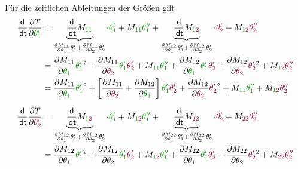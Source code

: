 \documentclass[a4paper, 12pt]{scrartcl}
\newcommand{\gruen}[2][gruen]{\textcolor{#1}{#2}}
\newcommand{\dunkelrot}[2][dunkelrot]{\textcolor{#1}{#2}}
\newcommand{\dt}{\thinspace \mathsf{dt}}
\begin{document}
Für die zeitlichen Ableitungen der Größen gilt 
\begin{align*}
    \frac{\mathsf{d}}{\dt} \frac{\partial T}{\partial \gruen{\theta_{1}'}} 
    &=
    \underbrace{
        \frac{\mathsf{d}}{\dt} M_{\gruen{1 1}}
    }_{
        \frac{\partial M_{11}}{\partial \theta_{1}} \theta_{1}' 
        + \frac{\partial M_{11}}{\partial \theta_{2}} \theta_{2}'
        } 
    \cdot \gruen{\theta_{1}'} + M_{\gruen{1 1}} \gruen{\theta_{1}''} + 
    \underbrace{
        \frac{\mathsf{d}}{\dt} M_{\gruen{1}\dunkelrot{2}}
        }_{
            \frac{\partial M_{12}}{\partial \theta_{1}} \theta_{1}' + \frac{\partial M_{12}}{\partial \theta_{2}} \theta_{2}'
            } 
        \cdot \dunkelrot{\theta_{2}'} + M_{\gruen{1}\dunkelrot{2}} \dunkelrot{\theta_{2}''} 
    \\
    &= \frac{\partial M_{11}}{\partial \gruen{\theta_{1}}} \gruen{\theta_{1}'}^2
    + \frac{\partial M_{11}}{\partial \dunkelrot{\theta_{2}}} \gruen{\theta_{1}'} \dunkelrot{ \theta_{2}'} 
    +  M_{\gruen{1 1}} \gruen{\theta_{1}''} 
    + \frac{\partial M_{12}}{\partial \gruen{\theta_{1}}} \gruen{\theta_{1}'} \dunkelrot{\theta_{2}'} 
    + \frac{\partial M_{12}}{\partial \dunkelrot{\theta_{2}}} \dunkelrot{\theta_{2}'}^2 
    + M_{\gruen{1}\dunkelrot{2}} \dunkelrot{\theta_{2}''} \\
    &=
    \frac{\partial M_{11}}{\partial \gruen{\theta_{1}}} \gruen{\theta_{1}'}^2
    + \left[ 
        \frac{\partial M_{11}}{\partial \dunkelrot{\theta_{2}}} + \frac{\partial M_{12}}{\partial \gruen{\theta_{1}}} 
        \right] 
    \gruen{\theta_{1}'} \dunkelrot{ \theta_{2}'} 
    + \frac{\partial M_{12}}{\partial \dunkelrot{\theta_{2}}} \dunkelrot{\theta_{2}'}^2 
    + M_{\gruen{1 1}} \gruen{\theta_{1}''} + M_{\gruen{1}\dunkelrot{2}} \dunkelrot{\theta_{2}''}
\end{align*}

\begin{align*}
\frac{\mathsf{d}}{\dt} \frac{\partial T}{\partial \dunkelrot{\theta_{2}'}} 
&=
\underbrace{\frac{\mathsf{d}}{\dt} M_{\gruen{1}\dunkelrot{2}}}_{\frac{\partial M_{12}}{\partial \theta_{1}} \theta_{1}' + \frac{\partial M_{12}}{\partial \theta_{2}} \theta_{2}'} \cdot \gruen{\theta_{1}'} + M_{\gruen{1}\dunkelrot{2}} \gruen{\theta_{1}''} + \underbrace{\frac{\mathsf{d}}{\dt} M_{\dunkelrot{22}}}_{\frac{\partial M_{22}}{\partial \theta_{1}} \theta_{1}' + \frac{\partial M_{22}}{\partial \theta_{2}} \theta_{2}'} \cdot \dunkelrot{\theta_{2}'} + M_{\dunkelrot{22}} \dunkelrot{\theta_{2}''} \\
&= 
\frac{\partial M_{12}}{\partial \theta_{1}}  \gruen{\theta_{1}'}^2 
 + \frac{\partial M_{12}}{\partial \theta_{2}} \gruen{\theta_{1}'} \dunkelrot{\theta_{2}'} 
 + M_{\gruen{1}\dunkelrot{2}} \gruen{\theta_{1}''}
 + \frac{\partial M_{22}}{\partial \theta_{1}} \gruen{\theta_{1}'} \dunkelrot{\theta_{2}'} 
 + \frac{\partial M_{22}}{\partial \theta_{2}}  \dunkelrot{\theta_{2}'}^2 
 + M_{\dunkelrot{22}} \dunkelrot{\theta_{2}''}
\end{align*}
\end{document}
